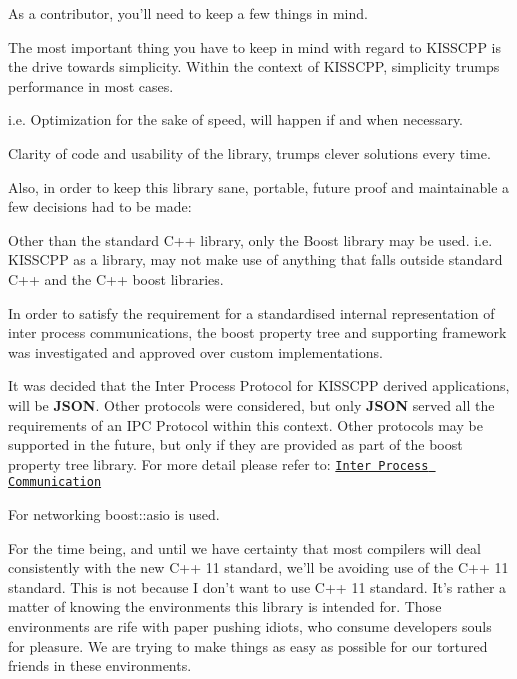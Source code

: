 As a contributor, you'll need to keep a few things in mind.

The most important thing you have to keep in mind with regard to K\-I\-S\-S\-C\-P\-P is the drive towards simplicity. Within the context of K\-I\-S\-S\-C\-P\-P, simplicity trumps performance in most cases.

i.\-e. Optimization for the sake of speed, will happen if and when necessary.

Clarity of code and usability of the library, trumps clever solutions every time.

Also, in order to keep this library sane, portable, future proof and maintainable a few decisions had to be made\-:


\begin{DoxyEnumerate}
\item Other than the standard C++ library, only the Boost library may be used. i.\-e. K\-I\-S\-S\-C\-P\-P as a library, may not make use of anything that falls outside standard C++ and the C++ boost libraries.
\item In order to satisfy the requirement for a standardised internal representation of inter process communications, the boost property tree and supporting framework was investigated and approved over custom implementations.
\item It was decided that the Inter Process Protocol for K\-I\-S\-S\-C\-P\-P derived applications, will be {\bfseries J\-S\-O\-N}. Other protocols were considered, but only {\bfseries J\-S\-O\-N} served all the requirements of an I\-P\-C Protocol within this context. Other protocols may be supported in the future, but only if they are provided as part of the boost property tree library. For more detail please refer to\-: \href{md_inter_process_communication.html}{\tt Inter Process Communication}
\item For networking boost\-::asio is used.
\item For the time being, and until we have certainty that most compilers will deal consistently with the new C++ 11 standard, we'll be avoiding use of the C++ 11 standard. This is not because I don't want to use C++ 11 standard. It's rather a matter of knowing the environments this library is intended for. Those environments are rife with paper pushing idiots, who consume developers souls for pleasure. We are trying to make things as easy as possible for our tortured friends in these environments. 
\end{DoxyEnumerate}